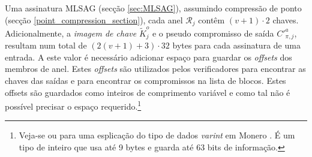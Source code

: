 Uma assinatura MLSAG (secção \ref{sec:MLSAG}),
assumindo compressão de ponto (secção \ref{point_compression_section}), cada anel \(\mathcal{R}_j\) contêm \((v+1) \cdot 2\) chaves. Adicionalmente, a {\em imagem de chave} \(\tilde{K}^o_j\) e o pseudo compromisso de saída $C'^a_{\pi,j}$, resultam num total de $(2(v+1)+3) \cdot 32$ bytes para cada assinatura de uma entrada.
A este valor é necessário adicionar espaço para guardar os {\em offsets} dos membros de anel. Estes {\em offsets} são utilizados pelos verificadores para encontrar as chaves das saídas e para encontrar os compromissos na lista de blocos. Estes offsets são guardados como inteiros de comprimento variável e como tal não é possível precisar o espaço requerido.\footnote{Veja-se \cite{varint-description} ou \cite{varint-spec} para uma esplicação do tipo de dados {\em varint} em Monero . É um tipo de inteiro que usa até 9 bytes e guarda até 63 bits de informação.} 


